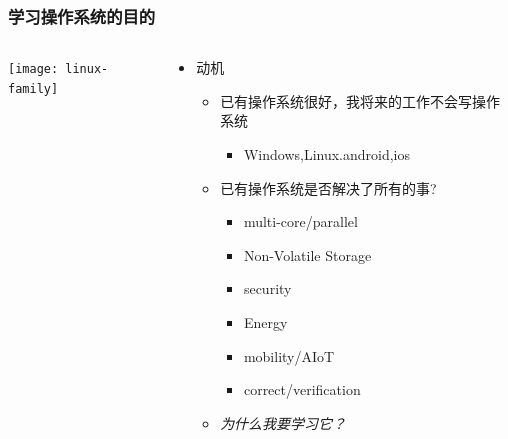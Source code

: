 
\begin{frame}
    \frametitle{学习操作系统的目的}
    \begin{columns}
    	
    	
   \begin{column}{0.5\textwidth}	
   	\texttt{[image: linux-family]}	
   \end{column}
 	
    \begin{column}{0.5\textwidth}
    \begin{itemize}
    \item 动机
    \begin{itemize}
    \item 已有操作系统很好，我将来的工作不会写操作系统
    \begin{itemize}
        \item Windows,Linux.android,ios
    \end{itemize}\pause
    \item 已有操作系统是否解决了所有的事?
        \begin{itemize}
        \item multi-core/parallel
        \item Non-Volatile Storage
        \item security
        \item Energy
        \item mobility/AIoT
        \item correct/verification
    \end{itemize}\pause
    \item \textit{为什么我要学习它？}
        \end{itemize}
    \end{itemize}
     \end{column}

     
%    
    
    \end{columns}
    
    \end{frame}

